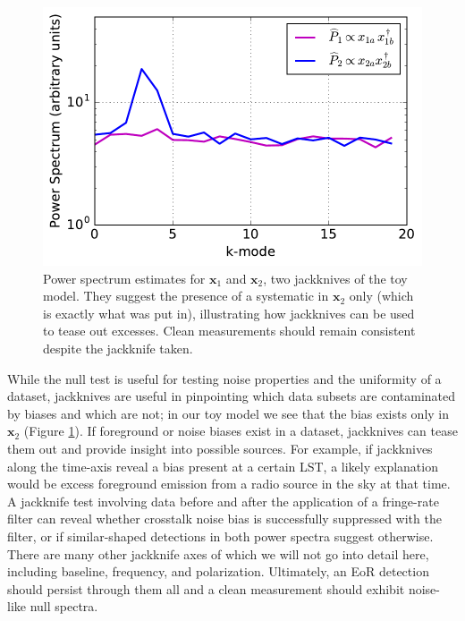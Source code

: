 \documentclass[preprint2,numberedappendix,tighten]{aastex6}  %
\begin{document}
\begin{figure}
	\centering
	\includegraphics[trim={0cm 0cm 0cm 0cm},width=\columnwidth]{plots/toy_bias2.pdf}
	\caption{Power spectrum estimates for $\textbf{x}_{1}$ and $\textbf{x}_{2}$, two jackknives of the toy model. They suggest 
the presence of a systematic in $\textbf{x}_{2}$ only (which is exactly what was put in), illustrating how jackknives can be used to tease out excesses. Clean 
measurements should remain consistent despite the jackknife taken.}
	\label{fig:toy_bias2}
\end{figure}

While the null test is useful for testing noise properties and the uniformity of a dataset, jackknives are useful in pinpointing 
which data subsets are contaminated by biases and which are not; in our toy model we see that the bias exists only in $
\textbf{x}_{2}$ (Figure \ref{fig:toy_bias2}). If foreground or noise biases exist in a dataset, jackknives can tease them out and 
provide insight into possible sources. For example, if jackknives along the time-axis reveal a bias present at a certain LST, a 
likely explanation would be excess foreground emission from a radio source in the sky at that time. A jackknife test involving 
data before and after the application of a fringe-rate filter can reveal whether crosstalk noise bias is successfully suppressed 
with the filter, or if similar-shaped detections in both power spectra suggest otherwise. There are many other jackknife axes of 
which we will not go into detail here, including baseline, frequency, and polarization. Ultimately, an EoR detection should persist 
through them all and a clean measurement should exhibit noise-like null spectra.
\end{document}
